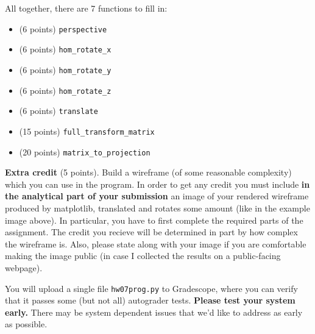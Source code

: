 \documentclass{article}
\theoremstyle{remark}
\begin{document}
\pagebreak
All together, there are 7 functions to fill in:
\begin{itemize}
\item (6 points) \texttt{perspective}
\item (6 points) \texttt{hom\_rotate\_x}
\item (6 points) \texttt{hom\_rotate\_y}
\item (6 points) \texttt{hom\_rotate\_z}
\item (6 points) \texttt{translate}
\item (15 points) \texttt{full\_transform\_matrix}
\item (20 points) \texttt{matrix\_to\_projection}
\end{itemize}
\textbf{Extra credit} (5 points). Build a wireframe (of some reasonable complexity) which you can use in the program.
In order to get any credit you must include \textbf{in the analytical part of your submission} an image of your rendered wireframe produced by matplotlib, translated and rotates some amount (like in the example image above).
In particular, you have to first complete the required parts of the assignment.
The credit you recieve will be determined in part by how complex the wireframe is.
Also, please state along with your image if you are comfortable making the image public (in case I collected the results on a public-facing webpage).

You will upload a single file \texttt{hw07prog.py} to Gradescope, where you can verify that it passes some (but not all) autograder tests.
\textbf{Please test your system early.}
There may be system dependent issues that we'd like to address as early as possible.
\end{document}
